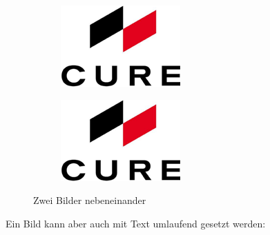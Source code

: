 \begin{figure}[H]
    \centering
    \begin{subfigure}[b]{.49\textwidth}
        \centering
        \includegraphics[width=.9\textwidth]{images/essential/firmenlogo.png}
        \vspace{4pt}
        \caption{}
        \label{fig:subfigure:a}
    \end{subfigure}
    \begin{subfigure}[b]{.49\textwidth}
        \centering
        \includegraphics[width=.9\textwidth]{images/essential/firmenlogo.png}
        \vspace{6pt}
        \caption{}
        \label{fig:subfigure:b}
    \end{subfigure}
    \caption{Zwei Bilder nebeneinander}
\end{figure}

Ein Bild kann aber auch mit Text umlaufend gesetzt werden:

